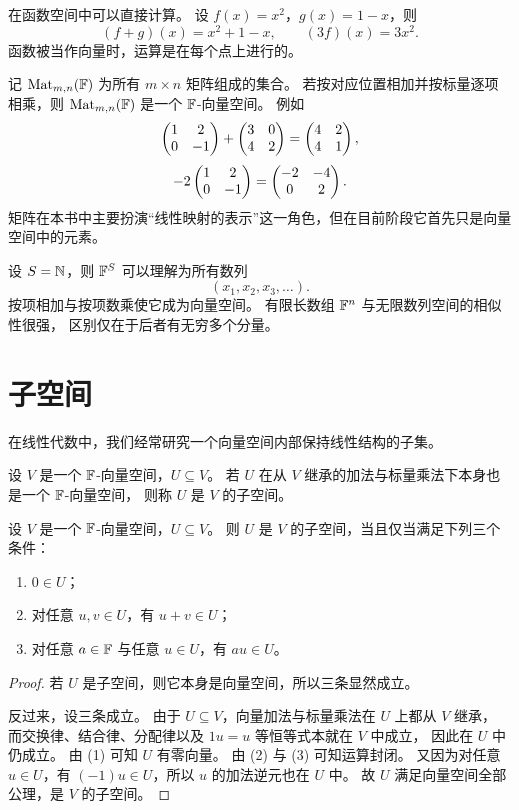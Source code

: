 \begin{example} 在函数空间中可以直接计算。
设 $f(x)=x^2$，$g(x)=1-x$，则 \[
(f+g)(x)=x^2+1-x, \qquad
(3f)(x)=3x^2. \]
函数被当作向量时，运算是在每个点上进行的。 \end{example}

\begin{example} 记 $\mathrm{Mat}_{m,n}(\mathbb{F})$ 为所有 $m\times n$ 矩阵组成的集合。
若按对应位置相加并按标量逐项相乘，则 $\mathrm{Mat}_{m,n}(\mathbb{F})$ 是一个 $\mathbb{F}$-向量空间。 例如
\[ \begin{pmatrix} 1&2\\0&-1 \end{pmatrix}+\begin{pmatrix} 3&0\\4&2 \end{pmatrix}=\begin{pmatrix} 4&2\\4&1 \end{pmatrix},
\] \[
-2\begin{pmatrix} 1&2\\0&-1 \end{pmatrix}=\begin{pmatrix} -2&-4\\0&2 \end{pmatrix}. \]
矩阵在本书中主要扮演“线性映射的表示”这一角色，但在目前阶段它首先只是向量空间中的元素。 \end{example}

\begin{example} 设 $S=\mathbb{N}$，则 $\mathbb{F}^S$ 可以理解为所有数列
\[ (x_1,x_2,x_3,\dots).
\] 按项相加与按项数乘使它成为向量空间。
有限长数组 $\mathbb{F}^n$ 与无限数列空间的相似性很强， 区别仅在于后者有无穷多个分量。
\end{example}

\section{子空间}

在线性代数中，我们经常研究一个向量空间内部保持线性结构的子集。

\begin{definition} 设 $V$ 是一个 $\mathbb{F}$-向量空间，$U\subseteq V$。
若 $U$ 在从 $V$ 继承的加法与标量乘法下本身也是一个 $\mathbb{F}$-向量空间， 则称 $U$ 是 $V$ 的子空间。
\end{definition}

\begin{theorem}[子空间判定法] 设 $V$ 是一个 $\mathbb{F}$-向量空间，$U\subseteq V$。
则 $U$ 是 $V$ 的子空间，当且仅当满足下列三个条件： \begin{enumerate}[label=\textup{(\arabic*)}]
\item $0\in U$； \item 对任意 $u,v\in U$，有 $u+v\in U$；
\item 对任意 $a\in\mathbb{F}$ 与任意 $u\in U$，有 $au\in U$。 \end{enumerate}
\end{theorem}

\begin{proof} 若 $U$ 是子空间，则它本身是向量空间，所以三条显然成立。

反过来，设三条成立。 由于 $U\subseteq V$，向量加法与标量乘法在 $U$ 上都从 $V$ 继承，
而交换律、结合律、分配律以及 $1u=u$ 等恒等式本就在 $V$ 中成立， 因此在 $U$ 中仍成立。
由 (1) 可知 $U$ 有零向量。 由 (2) 与 (3) 可知运算封闭。
又因为对任意 $u\in U$，有 $(-1)u\in U$，所以 $u$ 的加法逆元也在 $U$ 中。 故 $U$ 满足向量空间全部公理，是 $V$ 的子空间。
\end{proof}

